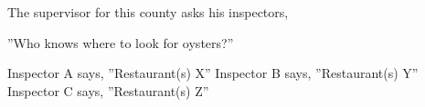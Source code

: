 \noindent The supervisor for this county asks his inspectors, 
	\begin{exe}
	\ex ''Who knows where to look for oysters?''
		\begin{xlist}
			\ex Inspector A says, ''Restaurant(s) X''
			\ex Inspector B says, ''Restaurant(s) Y''
			\ex Inspector C says, ''Restaurant(s) Z''\\
		\end{xlist}
	\end{exe}





